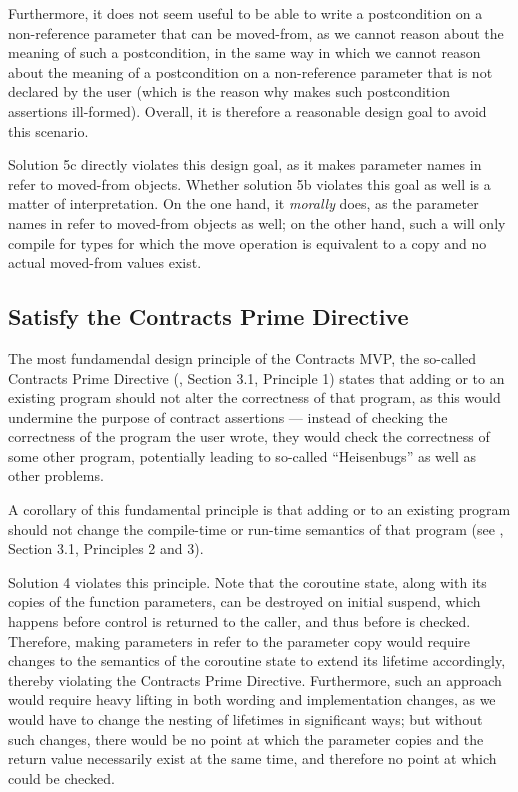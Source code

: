 Furthermore, it does not seem useful to be able to write a postcondition on a non-reference parameter that can be moved-from, as we cannot reason about the meaning of such a postcondition, in the same way in which we cannot reason about the meaning of a postcondition on a non-reference parameter that is not declared  by the user (which is the reason why \cite{P2900R8} makes such postcondition assertions ill-formed). Overall, it is therefore a reasonable design goal to avoid this scenario.

Solution 5c directly violates this design goal, as it makes parameter names in  refer to moved-from objects. Whether solution 5b violates this goal as well is a matter of interpretation. On the one hand, it \emph{morally} does, as the parameter names in  refer to moved-from objects as well; on the other hand, such a  will only compile for types for which the move operation is equivalent to a copy and no actual moved-from values exist.
\subsection{Satisfy the Contracts Prime Directive}
\label{goal_prime_directive}

The most fundamendal design principle of the Contracts MVP, the so-called Contracts Prime Directive (\cite{P2900R8}, Section 3.1, Principle 1) states that adding  or  to an existing program should not alter the correctness of that program, as this would undermine the purpose of contract assertions --- instead of checking the correctness of the program the user wrote, they would check the correctness of some other program, potentially leading to so-called ``Heisenbugs'' as well as other problems.

A corollary of this fundamental principle is that adding  or  to an existing program should not change the compile-time or run-time semantics of that program (see \cite{P2900R8}, Section 3.1, Principles 2 and 3).

Solution 4 violates this principle. Note that the coroutine state, along with its copies of the function parameters, can be destroyed on initial suspend, which happens before control is returned to the caller, and thus before  is checked. Therefore, making parameters in  refer to the parameter copy would require changes to the semantics of the coroutine state to extend its lifetime accordingly, thereby violating the Contracts Prime Directive. Furthermore, such an approach would require heavy lifting in both wording and implementation changes, as we would have to change the nesting of lifetimes in significant ways; but without such changes, there would be no point at which the parameter copies and the return value necessarily exist at the same time, and therefore no point at which  could be checked.

